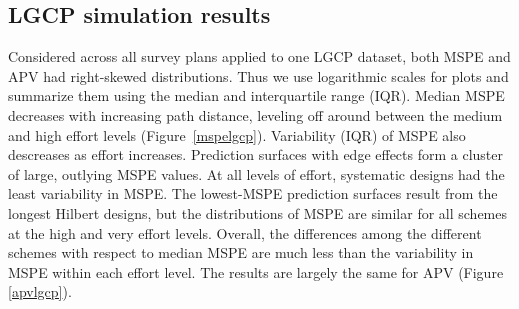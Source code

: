 \documentclass[review]{elsarticle}
\begin{document}
\subsection{LGCP simulation results}

Considered across all survey plans applied to one LGCP dataset, both MSPE and
APV had right-skewed distributions. Thus we use logarithmic scales for plots
and summarize them using the median and interquartile range (IQR). Median MSPE
decreases with increasing path distance, leveling off around between the medium
and high effort levels (Figure~\ref{mspelgcp}). Variability (IQR) of MSPE
also descreases as effort increases. Prediction surfaces with edge effects form
a cluster of large, outlying MSPE values. At all levels of effort, systematic
designs had the least variability in MSPE. The lowest-MSPE prediction surfaces
result from the longest Hilbert designs, but the distributions of MSPE are
similar for all schemes at the high and very effort levels. Overall, the
differences among the different schemes with respect to median MSPE are much
less than the variability in MSPE within each effort level. The results are
largely the same for APV (Figure \ref{apvlgcp}).



\end{document}

